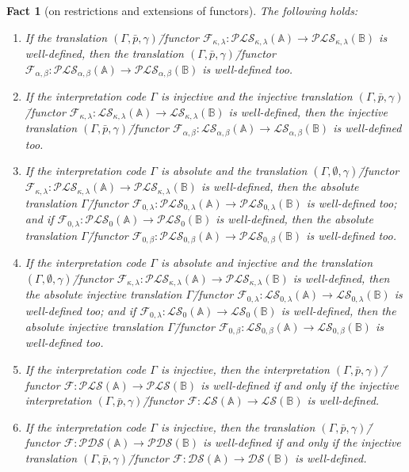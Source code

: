 \documentclass[12pt]{article}
\newtheorem{fact}{Fact}
\theoremstyle{definition}
\def\MA{{\mathbb{A}}}
\def\MB{{\mathbb{B}}}
\def\F{{\mathcal{F}}}
\def\PLS{{\mathcal{PLS}}}
\def\PDS{{\mathcal{PDS}}}
\def\DS{{\mathcal{DS}}}
\def\LS{{\mathcal{LS}}}
\begin{document}
\begin{fact}[on restrictions and extensions of functors]\label{fact:functor} 
The following holds:
\begin{enumerate}
    \item If the translation $(\Gamma,\bar p,\gamma)$\=/functor $\F_{\kappa,\lambda}\colon \PLS_{\kappa,\lambda}(\MA)\to \PLS_{\kappa,\lambda}(\MB)$ is well-defined, then the translation $(\Gamma,\bar p,\gamma)$\=/functor $\F_{\alpha,\beta}\colon \PLS_{\alpha,\beta}(\MA)\to \PLS_{\alpha,\beta}(\MB)$ is well-defined too. 
    \item If the interpretation code $\Gamma$ is injective and the injective translation $(\Gamma,\bar p,\gamma)$\=/functor $\F_{\kappa,\lambda}\colon \LS_{\kappa,\lambda}(\MA)\to \LS_{\kappa,\lambda}(\MB)$ is well-defined, then the injective translation $(\Gamma,\bar p,\gamma)$\=/functor $\F_{\alpha,\beta}\colon \LS_{\alpha,\beta}(\MA)\to \LS_{\alpha,\beta}(\MB)$ is well-defined too. 
    \item If the interpretation code $\Gamma$ is absolute and the translation $(\Gamma,\emptyset,\gamma)$\=/functor $\F_{\kappa,\lambda}\colon \PLS_{\kappa,\lambda}(\MA)\to \PLS_{\kappa,\lambda}(\MB)$ is well-defined, then the absolute translation $\Gamma$\=/functor $\F_{0,\lambda}\colon \PLS_{0,\lambda}(\MA)\to \PLS_{0,\lambda}(\MB)$ is well-defined too; and if $\F_{0,\lambda}\colon \PLS_0(\MA)\to \PLS_0(\MB)$ is well-defined, then the absolute translation $\Gamma$\=/functor $\F_{0,\beta}\colon \PLS_{0,\beta}(\MA)\to \PLS_{0,\beta}(\MB)$ is well-defined too.
    \item If the interpretation code $\Gamma$ is absolute and injective and the translation $(\Gamma,\emptyset,\gamma)$\=/functor $\F_{\kappa,\lambda}\colon \PLS_{\kappa,\lambda}(\MA)\to \PLS_{\kappa,\lambda}(\MB)$ is well-defined, then the absolute injective translation $\Gamma$\=/functor $\F_{0,\lambda}\colon \LS_{0,\lambda}(\MA)\to \LS_{0,\lambda}(\MB)$ is well-defined too; and if $\F_{0,\lambda}\colon \LS_0(\MA)\to \LS_0(\MB)$ is well-defined, then the absolute injective translation $\Gamma$\=/functor $\F_{0,\beta}\colon \LS_{0,\beta}(\MA)\to \LS_{0,\beta}(\MB)$ is well-defined too.
    \item If the interpretation code $\Gamma$ is injective, then the interpretation $(\Gamma,\bar p,\gamma)$\=/functor $\F\colon \PLS(\MA)\to \PLS(\MB)$ is well-defined if and only if the injective interpretation $(\Gamma,\bar p,\gamma)$\=/functor $\F\colon \LS(\MA)\to \LS(\MB)$ is well-defined. 
    \item If the interpretation code $\Gamma$ is injective, then the translation $(\Gamma,\bar p,\gamma)$\=/functor $\F\colon \PDS(\MA)\to \PDS(\MB)$ is well-defined if and only if the injective translation $(\Gamma,\bar p,\gamma)$\=/functor $\F\colon \DS(\MA)\to \DS(\MB)$ is well-defined.
\end{enumerate}
\end{fact}
\end{document}
